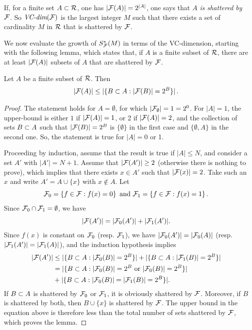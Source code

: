 \begin{remark}
\label{rem:vc}
If, for a finite set $A \subset {\mathcal R}$, one has $|{\mathcal F}(A)| = 2^{|A|}$, one says that {\em $A$ is shattered by ${\mathcal F}$}. So $\textit{VC-dim}({\mathcal F})$ is the largest integer $M$ such that there exists a set of cardinality $M$ in ${\mathcal R}$ that is shattered by ${\mathcal F}$.
\end{remark}

We now evaluate the growth of $S^*_{\mathcal F}(M)$ in terms of the VC-dimension, starting with the following lemma, which states that, if $A$ is a finite subset of ${\mathcal R}$, there are at least $|{\mathcal F}(A)|$ subsets of $A$ that are shattered by ${\mathcal F}$. 
\begin{lemma}[Pajor]
\label{lem:pajor}
Let $A$ be a finite subset of ${\mathcal R}$. Then
\[
|{\mathcal F}(A)| \leq |\{B\subset A: |{\mathcal F}(B)| = 2^B\}|  \,.
\]
\end{lemma}
\begin{proof}
 The statement holds for $A = \emptyset$, for which $|{\mathcal F}_\emptyset|=1 = 2^0$. 
 For $|A|=1$,  the upper-bound is either $1$ if $|{\mathcal F}(A)| = 1$, or 2 if $|{\mathcal F}(A)| = 2$, and the collection of sets  $B\subset A$ such that $|{\mathcal F}(B)| = 2^B$ is $\{\emptyset\}$ in the first case and $\{\emptyset, A\}$ in the second one. 
 So, the statement is true for $|A|=0$ or 1.


Proceeding by induction, assume that the result is true if $|A| \leq N$, and consider a set $A'$ with $|A'| = N+1$. Assume that $|{\mathcal F}(A')| \geq 2$ (otherwise there is nothing to prove), which implies that there exists $x\in A'$ such that $|{\mathcal F}(x)|=2$.  Take such an $x$ and write $A' = A \cup \{x\}$ with $x\not \in A$. Let
\[
{\mathcal F}_0 = \left\{ f\in {\mathcal F}: f(x) = 0 \right\} \text{ and } {\mathcal F}_1 = \left\{ f\in {\mathcal F}: f(x) = 1 \right\}.
\]
Since ${\mathcal F}_0 \cap {\mathcal F}_1 = \emptyset$, we have 
\[
|{\mathcal F}(A')| = |{\mathcal F}_0(A')| + |{\mathcal F}_1(A')|.
\]
Since $f(x)$ is constant on ${\mathcal F}_0$ (resp. ${\mathcal F}_1$), we have  $|{\mathcal F}_0(A')| = |{\mathcal F}_0(A)|$ (resp.  $|{\mathcal F}_1(A')| = |{\mathcal F}_1(A)|$), and the induction hypothesis implies
\begin{align*}
|{\mathcal F}(A')| & \leq |\{B\subset A: |{\mathcal F}_0(B)| = 2^B\}| + |\{B\subset A: |{\mathcal F}_1(B)| = 2^B\}| \\
& = |\{B\subset A: |{\mathcal F}_0(B)| = 2^B \text{ or } |{\mathcal F}_0(B)| = 2^B\}| \\
&+ |\{B\subset A: |{\mathcal F}_0(B)| =|{\mathcal F}_1(B)| = 2^B\}| .
\end{align*}
If $B\subset A$ is shattered by ${\mathcal F}_0$ or ${\mathcal F}_1$, it is obviously shattered by ${\mathcal F}$. Moreover, if $B$ is shattered by both, then $B\cup \{x\}$ is shattered by  ${\mathcal F}$. The upper bound in the equation above is therefore less than the total number of sets shattered by ${\mathcal F}$, which proves the lemma.
\end{proof}


